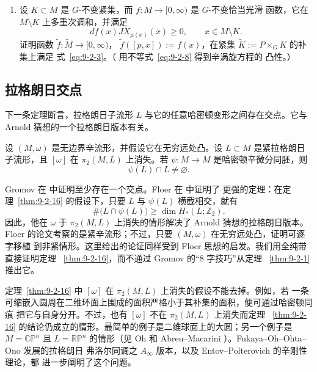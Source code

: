 \begin{exercise}
\begin{enumerate}[label=\arabic*.]
\item 设 $K\subset M$ 是 $G$-不变紧集，而 $f:M\to[0,\infty)$ 是 $G$-不变恰当光滑
函数，它在 $M\setminus K$ 上多重次调和，并满足
\begin{equation}\label{eq:9-2-8}
  df(x)JX_{\mu(x)}(x)\ge0,
  \qquad x\in M\setminus K.
\end{equation}
证明函数 $\widetilde f:\widetilde M\to[0,\infty)$，
$\widetilde f([p,x]):=f(x)$，在紧集 $\widetilde K:=P\times_GK$ 的补集上满足
式~\eqref{eq:9-2-3}。（ 用不等式~\eqref{eq:9-2-8} 得到辛涡旋方程的
凸性。）
\end{enumerate}
\end{exercise}

\subsection*{拉格朗日交点}

下一条定理断言，拉格朗日子流形 $L$ 与它的任意哈密顿变形之间存在交点。它与
Arnold 猜想的一个拉格朗日版本有关。

\begin{theorem}[Gromov]\label{thm:9-2-16}
设 $(M,\omega)$ 是无边界辛流形，并假设它在无穷远处凸。设 $L\subset M$ 是紧拉格朗日
子流形，且 $[\omega]$ 在 $\pi_2(M,L)$ 上消失。若
$\psi:M\to M$ 是哈密顿辛微分同胚，则
\[
  \psi(L)\cap L\ne\varnothing.
\]
\end{theorem}

Gromov 在  中证明至少存在一个交点。Floer 在  中证明了
更强的定理：在定理~\ref{thm:9-2-16} 的假设下，只要 $L$ 与 $\psi(L)$ 横截相交，就有
\[
  \#\bigl(L\cap\psi(L)\bigr)\ge\dim H_*(L;\mathbb Z_2).
\]
因此，他在 $\omega$ 于 $\pi_2(M,L)$ 上消失的情形解决了 Arnold 猜想的拉格朗日版本。
Floer 的论文考察的是紧辛流形；不过，只要 $(M,\omega)$ 在无穷远处凸，证明可逐字移植
到非紧情形。这里给出的论证同样受到 Floer 思想的启发。我们用全纯带直接证明定理
~\ref{thm:9-2-16}，而不通过 Gromov  的“8 字技巧”从定理
~\ref{thm:9-2-1} 推出它。

定理~\ref{thm:9-2-16} 中 $[\omega]$ 在 $\pi_2(M,L)$ 上消失的假设不能去掉。例如，若
一条可缩嵌入圆周在二维环面上围成的面积严格小于其补集的面积，便可通过哈密顿同痕
把它与自身分开。不过，也有 $[\omega]$ 不在 $\pi_2(M,L)$ 上消失而定理
~\ref{thm:9-2-16} 的结论仍成立的情形。最简单的例子是二维球面上的大圆；另一个例子是
$M=\mathbb{CP}^n$ 且 $L=\mathbb{RP}^n$ 的情形（见 Oh  和
Abreu--Macarini ）。Fukaya--Oh--Ohta--Ono  发展的拉格朗日
弗洛尔同调之 $A_\infty$ 版本，以及 Entov--Polterovich  的辛刚性理论，都
进一步阐明了这个问题。

